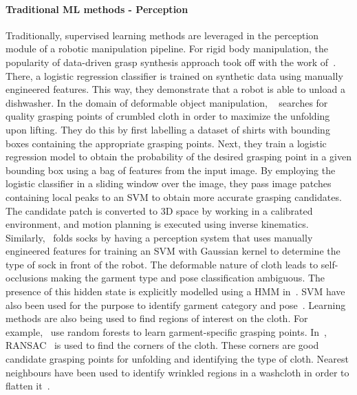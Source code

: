 \documentclass[\home/main.tex]{subfiles}
\begin{document}
\paragraph{Traditional ML methods - Perception}
Traditionally, supervised learning methods are leveraged in the perception module of a robotic manipulation pipeline. For rigid body manipulation, the popularity of data-driven grasp synthesis approach took off with the work of~\textcite{Saxena2008}. There, a logistic regression classifier is trained on synthetic data using manually engineered features. This way, they demonstrate that a robot is able to unload a dishwasher. In the domain of deformable object manipulation, ~\textcite{Ramisa2012} searches for quality grasping points of crumbled cloth in order to maximize the unfolding upon lifting. They do this by first labelling a dataset of shirts with bounding boxes containing the appropriate grasping points. Next, they train a logistic regression model to obtain the probability of the desired grasping point in a given bounding box using a bag of features from the input image. By employing the logistic classifier in a sliding window over the image, they pass image patches containing local peaks to an \gls{SVM} to obtain more accurate grasping candidates. The candidate patch is converted to 3D space by working in a calibrated environment, and motion planning is executed using inverse kinematics. Similarly,~\textcite{Wang2011} folds socks by having a perception system that uses manually engineered features for training an \gls{SVM} with Gaussian kernel to determine the type of sock in front of the robot. The deformable nature of cloth leads to self-occlusions making the garment type and pose classification ambiguous. The presence of this hidden state is explicitly modelled using a \gls{HMM} in~\autocite{Cusumano2011}. \gls{SVM} have also been used for the purpose to identify garment category and pose~\autocite{Li2014, li2014volum}. Learning methods are also being used to find regions of interest on the cloth. For example,~\textcite{Doumanoglou2016} use random forests to learn garment-specific grasping points. In~\autocite{Maitin2010}, RANSAC~\autocite{RANSAC} is used to find the corners of the cloth. These corners are good candidate grasping points for unfolding and identifying the type of cloth. Nearest neighbours have been used to identify wrinkled regions in a washcloth in order to flatten it~\autocite{Willimon2011}.
\end{document}
